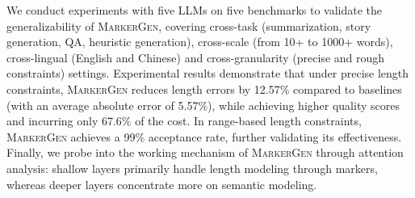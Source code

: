 


We conduct experiments with five LLMs on five benchmarks to validate the generalizability of \textsc{MarkerGen}, covering cross-task (summarization, story generation, QA, heuristic generation), cross-scale (from 10+ to 1000+ words), cross-lingual (English and Chinese) and cross-granularity (precise and rough constraints) settings.
Experimental results demonstrate that under precise length constraints, \textsc{MarkerGen} reduces length errors by 12.57\% compared to baselines (with an average absolute error of 5.57\%), while achieving higher quality scores and incurring only 67.6\% of the cost. 
In range-based length constraints, \textsc{MarkerGen} achieves a 99\% acceptance rate, further validating its effectiveness. 
Finally, we probe into the working
mechanism of \textsc{MarkerGen} through attention analysis: shallow layers primarily handle length modeling through markers, whereas deeper layers concentrate more on semantic modeling.



